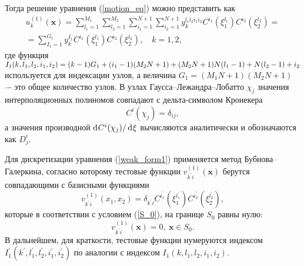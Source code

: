 \documentclass[press]{vestnik}
\begin{document}
Тогда решение уравнения (\ref{motion_eq}) можно представить как
\begin{multline} \label{u_1k}
	u_{k}^{(1)}(\bm{x})  =  \sum_{l_{1}=1}^{M_{1}} \sum_{l_{2}=1}^{M_{2}} \sum_{i_{1}=1}^{N+1} \sum_{i_{2}=1}^{N+1} y_{k}^{l_{1}l_{2}i_{1}i_{2}} C^{i_{1}}(\xi_{1}^{l_{1}}) C^{i_{2}}(\xi_{2}^{l_{2}})  =
	\\ 
	=  \sum_{I_{1}=1}^{G_{1}} y_{k}^{I_{1}} C^{i_{1}}(\xi_{1}^{l_{1}}) C^{i_{2}}(\xi_{2}^{l_{2}}), \quad k=1,2,
\end{multline}
где функция $I_1(k,l_1,l_2,i_1,i_2) = (k-1)G_{1}+(i_1-1)(M_{2}N+1) \dm + (M_{2} N +1)N(l_1-1)+N(l_2-1)+i_2$ используется для индексации узлов, а величина $G_1 =(M_{1}N+1)(M_{2}N+1)$ –- это общее количество узлов. В узлах Гаусса--Лежандра--Лобатто $\chi_{j}$ значения интерполяционных полиномов совпадают с дельта-символом Кронекера
$$
C^{i}(\chi_{j})=\delta_{ij},
$$
а значения производной $\d C^{i}(\chi_{j}) / \d \xi$ вычисляются аналитически \cite{Golub_2015} и обозначаются как $D_{j}^{i}$. 

Для дискретизации уравнения (\ref{weak_form1}) применяется метод Бубнова--Галеркина, согласно которому тестовые функции $v_{k^{'}i}^{(1)}(\bm{x})$ берутся совпадающими с базисными функциями
\begin{equation} \label{v_1}
	v_{k^{'}i}^{(1)}(x_1,x_2) = \delta_{k^{'}i} C^{i_{1}^{'}}(\xi_{1}^{l_{1}^{'}}) C^{i_{2}^{'}}(\xi_{2}^{l_{2}^{'}}), 
\end{equation}
которые в соответствии с условием (\ref{S_0}), на границе $S_{0}$ равны нулю:
\begin{equation} \label{v_1_0}
	v_{k^{'}i}^{(1)}({\bm{x}}) = 0,\ \bm{x} \in S_{0}.
\end{equation}
В дальнейшем, для краткости, тестовые функции нумеруются индексом $I_{1}^{'}(k^{'},l_{1}^{'},l_{2}^{'},i_{1}^{'},i_{2}^{'})$ по аналогии с индексом $I_1(k,l_1,l_2,i_1,i_2)$.
\end{document}

